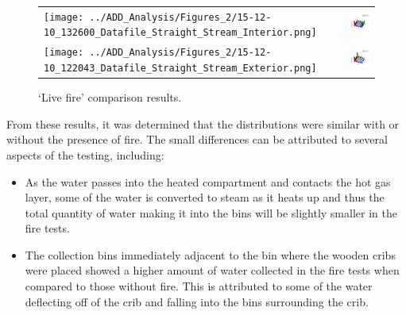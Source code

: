 \documentclass{article}
\begin{document}
\begin{figure}[ht]
\begin{tabular*}{\textwidth}{lr}
\texttt{[image: ../ADD\_Analysis/Figures\_2/15-12-10\_132600\_Datafile\_Straight\_Stream\_Interior.png]} &
\includegraphics[width=3.2in]{../ADD_Analysis/Figures/15-12-09_152435_Datafile_Straight_Stream_Interior.png} \\
\texttt{[image: ../ADD\_Analysis/Figures\_2/15-12-10\_122043\_Datafile\_Straight\_Stream\_Exterior.png]} &
\includegraphics[width=3.2in]{../ADD_Analysis/Figures/15-12-08_113237_Datafile_Straight_Stream_Exterior.png} \\
\end{tabular*}
\caption{`Live fire' comparison results.}
\label{fig:Live_Fire_Comparison}
\end{figure}

From these results, it was determined that the distributions were similar with or without the presence of fire. The small differences can be attributed to several aspects of the testing, including:

\begin{itemize}
	\item As the water passes into the heated compartment and contacts the hot gas layer, some of the water is converted to steam as it heats up and thus the total quantity of water making it into the bins will be slightly smaller in the fire tests.
	\item The collection bins immediately adjacent to the bin where the wooden cribs were placed showed a higher amount of water collected in the fire tests when compared to those without fire. This is attributed to some of the water deflecting off of the crib and falling into the bins surrounding the crib.
\end{itemize}
\end{document}
